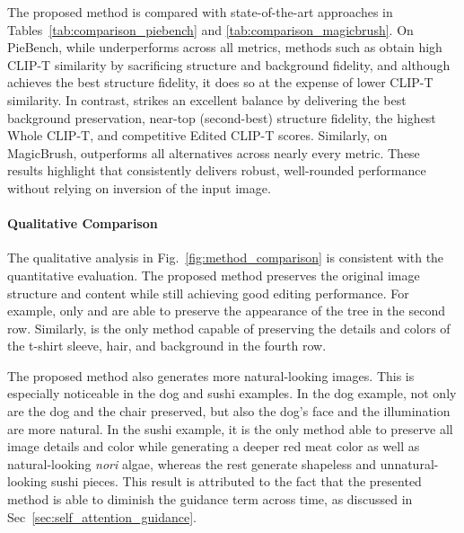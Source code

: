 {\modified{}The proposed method is compared} with state-of-the-art approaches in Tables~\ref{tab:comparison_piebench} and \ref{tab:comparison_magicbrush}. On PieBench, while \ptopzerolong{} underperforms across all metrics, methods such as \pnplong{} obtain high CLIP-T similarity by sacrificing structure and background fidelity, and although \negproxlong{} achieves the best structure fidelity, it does so at the expense of lower CLIP-T similarity. In contrast, \method{} strikes an excellent balance by delivering the best background preservation, near-top (second-best) structure fidelity, the highest Whole CLIP-T, and competitive Edited CLIP-T scores. Similarly, on MagicBrush, \method{} outperforms all alternatives across nearly every metric. These results highlight that \method{} consistently delivers robust, well-rounded performance without relying on inversion of the input image.





\paragraph{Qualitative Comparison}
\label{par:qualitative}


{\modified{}The qualitative analysis in} Fig.~\ref{fig:method_comparison} is consistent with the quantitative evaluation. {\modified{}The proposed method} preserves the original image structure and content while still achieving good editing performance. For example, only \method{} and \negprox{} are able to preserve the appearance of the tree in the second row. Similarly, \method{} is the only method capable of preserving the details and colors of the t-shirt sleeve, hair, and background in the fourth row.


{\modified{}The proposed method also generates} more natural-looking images. This is especially noticeable in the dog and sushi examples. In the dog example, not only are the dog and the chair preserved, but also the dog's face and the illumination are more natural. In the sushi example, {\modified{}it} is the only method able to preserve all image details and color while generating a deeper red meat color as well as natural-looking \textit{nori} algae, whereas the rest generate shapeless and unnatural-looking sushi pieces. {\modified{}This result is attributed} to the fact that {\modified{}the presented} method is able to diminish the guidance term across time, as discussed in Sec~\ref{sec:self_attention_guidance}.


